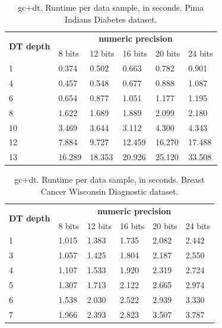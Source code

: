 \begin{table}[htp]
\centering
\caption{\acs{gc}+\acs{dt}. Runtime per data sample, in seconds. Pima Indians Diabetes dataset.}
\label{table:runtimeDTPID}
\begin{tabular}{|l|l|l|l|l|l|}
\hline
\multirow{2}{*}{\textbf{DT depth}} & \multicolumn{5}{c|}{\textbf{numeric precision}}         \\ \cline{2-6} 
                          & 8 bits & 12 bits & 16 bits & 20 bits & 24 bits \\ \hline
1                         & 0.374  & 0.502   & 0.663   & 0.782   & 0.901   \\ \hline
4                         & 0.457  & 0.548   & 0.677   & 0.888   & 1.087   \\ \hline
6                         & 0.654  & 0.877   & 1.051   & 1.177   & 1.195   \\ \hline
8                         & 1.622  & 1.689   & 1.889   & 2.099   & 2.180   \\ \hline
10                        & 3.469  & 3.644   & 3.112   & 4.300   & 4.343   \\ \hline
12                        & 7.884  & 9.727   & 12.459  & 16.270  & 17.488  \\ \hline
13                        & 16.289 & 18.353  & 20.926  & 25.120  & 33.508  \\ \hline
\end{tabular}
\end{table}

\begin{table}[htp]
\centering
\caption{\acs{gc}+\acs{dt}. Runtime per data sample, in seconds. Breast Cancer Wisconsin Diagnostic dataset.}
\label{table:runtimeDTBCW}
\begin{tabular}{|l|l|l|l|l|l|}
\hline
\multirow{2}{*}{\textbf{DT depth}} & \multicolumn{5}{c|}{\textbf{numeric precision}}         \\ \cline{2-6} 
                          & 8 bits & 12 bits & 16 bits & 20 bits & 24 bits \\ \hline
1                         & 1.015  & 1.383   & 1.735   & 2.082   & 2.442   \\ \hline
3                         & 1.057  & 1.425   & 1.804   & 2.187   & 2.550   \\ \hline
4                         & 1.107  & 1.533   & 1.920   & 2.319   & 2.724   \\ \hline
5                         & 1.307  & 1.713   & 2.122   & 2.665   & 2.974   \\ \hline
6                         & 1.538  & 2.030   & 2.522   & 2.939   & 3.330   \\ \hline
7                         & 1.966  & 2.393   & 2.823   & 3.507   & 3.787   \\ \hline
\end{tabular}
\end{table}


